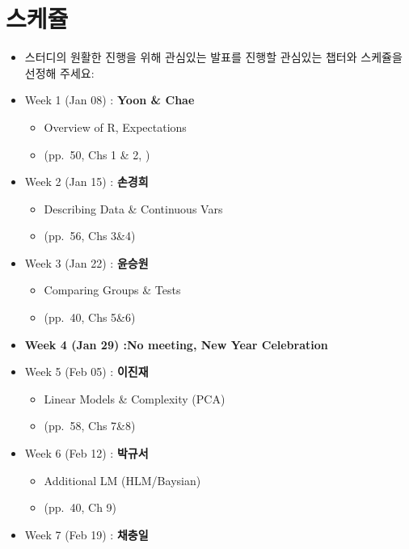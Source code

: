 \documentclass[
]{book}
\providecommand{\tightlist}{%
  \setlength{\itemsep}{0pt}\setlength{\parskip}{0pt}}
\begin{document}
\hypertarget{uxc2a4uxcf00uxc974}{%
\section{스케쥴}\label{uxc2a4uxcf00uxc974}}

\begin{itemize}
\tightlist
\item
  스터디의 원활한 진행을 위해 관심있는 발표를 진행할 관심있는 챕터와 스케쥴을 선정해 주세요:
\item
  Week 1 (Jan 08) : \textbf{Yoon \& Chae}

  \begin{itemize}
  \tightlist
  \item
    Overview of R, Expectations
  \item
    (pp.~50, Chs 1 \& 2, )
  \end{itemize}
\item
  Week 2 (Jan 15) : \textbf{손경희}

  \begin{itemize}
  \tightlist
  \item
    Describing Data \& Continuous Vars
  \item
    (pp.~56, Chs 3\&4)
  \end{itemize}
\item
  Week 3 (Jan 22) : \textbf{윤승원}

  \begin{itemize}
  \tightlist
  \item
    Comparing Groups \& Tests
  \item
    (pp.~40, Chs 5\&6)
  \end{itemize}
\item
  \textbf{Week 4 (Jan 29) :No meeting, New Year Celebration}
\item
  Week 5 (Feb 05) : \textbf{이진재}

  \begin{itemize}
  \tightlist
  \item
    Linear Models \& Complexity (PCA)
  \item
    (pp.~58, Chs 7\&8)
  \end{itemize}
\item
  Week 6 (Feb 12) : \textbf{박규서}

  \begin{itemize}
  \tightlist
  \item
    Additional LM (HLM/Baysian)
  \item
    (pp.~40, Ch 9)
  \end{itemize}
\item
  Week 7 (Feb 19) : \textbf{채충일}


\end{itemize}
\end{document}

